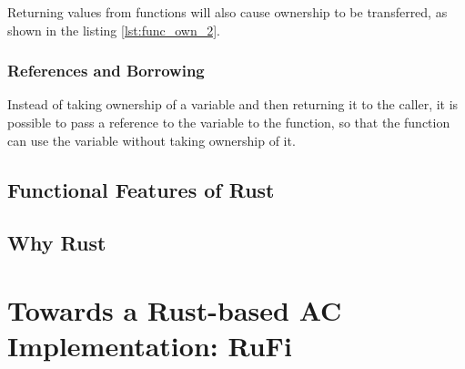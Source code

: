 Returning values from functions will also cause ownership to be transferred, as shown in the listing \ref{lst:func_own_2}.



\subsubsection{References and Borrowing}
Instead of taking ownership of a variable and then returning it to the caller, it is possible to pass a reference to the variable to the function, so that the function can use the variable without taking ownership of it.

\subsection{Functional Features of Rust}

\subsection{Why Rust}

\section{Towards a Rust-based AC Implementation: RuFi}
